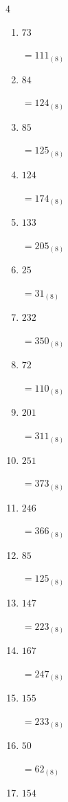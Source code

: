 \begin{multicols}{4}
\begin{enumerate}
  \item $73$

        $=111_{(8)}$

  \item $84$

        $=124_{(8)}$

  \item $85$

        $=125_{(8)}$

  \item $124$

        $=174_{(8)}$

  \item $133$

        $=205_{(8)}$

  \item $25$

        $=31_{(8)}$

  \item $232$

        $=350_{(8)}$

  \item $72$

        $=110_{(8)}$

  \item $201$

        $=311_{(8)}$

  \item $251$

        $=373_{(8)}$

  \item $246$

        $=366_{(8)}$

  \item $85$

        $=125_{(8)}$

  \item $147$

        $=223_{(8)}$

  \item $167$

        $=247_{(8)}$

\columnbreak %

  \item $155$

        $=233_{(8)}$

  \item $50$

        $=62_{(8)}$

  \item $154$


\end{enumerate}
\end{multicols}
